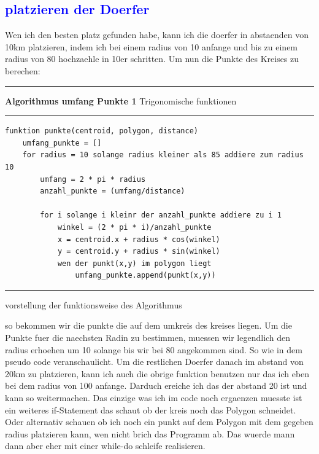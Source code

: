 \documentclass{article}
\begin{document}
\subsection{\textcolor{blue}{platzieren der Doerfer}}\label{sec:platzieren der Doerfer}
Wen ich den besten platz gefunden habe, kann ich die doerfer in abstaenden von 10km platzieren, indem ich bei einem radius von 10 anfange und bis zu einem radius von 80 hochzaehle in 10er schritten. Um nun die Punkte des Kreises zu berechen:
\vspace{5pt}
\hrule
\vspace{1.5pt}
\large{\textbf{Algorithmus umfang Punkte 1} Trigonomische funktionen}
\vspace{1.5pt}
\hrule
\begin{verbatim}
funktion punkte(centroid, polygon, distance)
	umfang_punkte = []
	for radius = 10 solange radius kleiner als 85 addiere zum radius 10
		umfang = 2 * pi * radius
		anzahl_punkte = (umfang/distance)
		
		for i solange i kleinr der anzahl_punkte addiere zu i 1
			winkel = (2 * pi * i)/anzahl_punkte
			x = centroid.x + radius * cos(winkel)
			y = centroid.y + radius * sin(winkel)
			wen der punkt(x,y) im polygon liegt
				umfang_punkte.append(punkt(x,y))
\end{verbatim}
\hrule
vorstellung der funktionsweise des Algorithmus\par
\vspace{5pt}
\raggedright 
so bekommen wir die punkte die auf dem umkreis des kreises liegen. Um die Punkte fuer die naechsten Radin zu bestimmen, muessen wir legendlich den radius erhoehen um 10 solange bis wir bei 80 angekommen sind. So wie in dem pseudo code veranschaulicht. Um die restlichen Doerfer danach im abstand von 20km zu platzieren, kann ich auch die obrige funktion benutzen nur das ich eben bei dem radius von 100 anfange. Darduch ereiche ich das der abstand 20 ist und kann so weitermachen. Das einzige was ich im code noch ergaenzen muesste ist ein weiteres if-Statement das schaut ob der kreis noch das Polygon schneidet. Oder alternativ schauen ob ich noch ein punkt auf dem Polygon mit dem gegeben radius platzieren kann, wen nicht brich das Programm ab. Das wuerde mann dann aber eher mit einer while-do schleife realisieren. 
\end{document}
